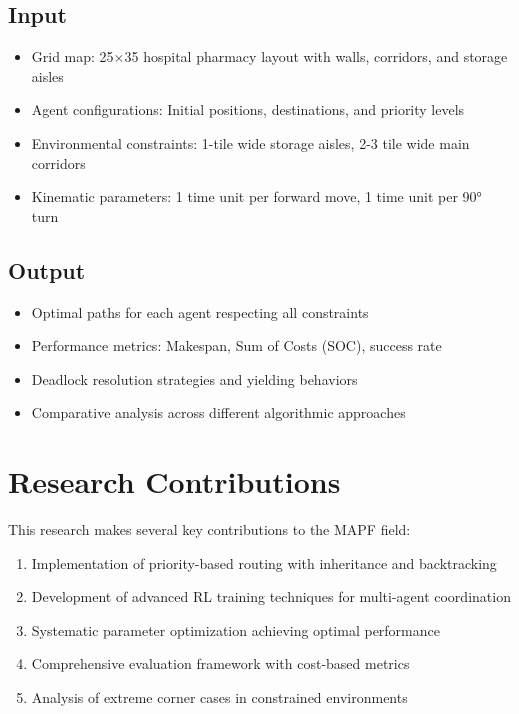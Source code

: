 \documentclass[12pt, a4paper]{report}
\begin{document}
\subsection{Input}
\begin{itemize}
    \item Grid map: 25×35 hospital pharmacy layout with walls, corridors, and storage aisles
    \item Agent configurations: Initial positions, destinations, and priority levels
    \item Environmental constraints: 1-tile wide storage aisles, 2-3 tile wide main corridors
    \item Kinematic parameters: 1 time unit per forward move, 1 time unit per 90° turn
\end{itemize}

\subsection{Output}
\begin{itemize}
    \item Optimal paths for each agent respecting all constraints
    \item Performance metrics: Makespan, Sum of Costs (SOC), success rate
    \item Deadlock resolution strategies and yielding behaviors
    \item Comparative analysis across different algorithmic approaches
\end{itemize}

\section{Research Contributions}

This research makes several key contributions to the MAPF field:
\begin{enumerate}
    \item Implementation of priority-based routing with inheritance and backtracking
    \item Development of advanced RL training techniques for multi-agent coordination
    \item Systematic parameter optimization achieving optimal performance
    \item Comprehensive evaluation framework with cost-based metrics
    \item Analysis of extreme corner cases in constrained environments
\end{enumerate}
\end{document}
